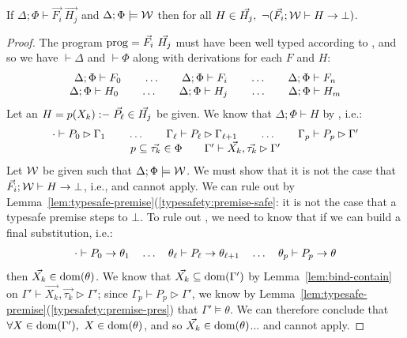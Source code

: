 \documentclass[acmsmall,screen,nonacm]{acmart}
\theoremstyle{definition}
\begin{document}
\begin{theorem}
\label{thm:typesafe-program-safe}
  If $\Delta; \Phi \vdash \vec{F_i} ~ \vec{H_j}$ and $\Delta; \Phi \models \mathcal{W}$ then
%
  for all $H \in \vec{H_j}, ~ \neg (\vec{F_i}; \mathcal{W} \vdash H \rightarrow \bot)$.
%
\begin{proof}
  The program $\mathrm{prog} = \vec{F_i} ~ \vec{H_j}$ must have been well
  typed according to , and so we have $\vdash \Delta$
  and $\vdash \Phi$ along with derivations for each $F$ and $H$:
%
  \[ \begin{array}{c} 
     \Delta; \Phi \vdash F_0 \quad\quad \dots \quad\quad
     \Delta; \Phi \vdash F_i \quad\quad \dots \quad\quad
     \Delta; \Phi \vdash F_n \\
     \Delta; \Phi \vdash H_0 \quad\quad \dots \quad\quad
     \Delta; \Phi \vdash H_j \quad\quad \dots \quad\quad
     \Delta; \Phi \vdash H_m \\
   \end{array} \]
%
  Let an $H = p(X_k) \mathrel{\mathsf{\mathord{:}\mathord{-}}} \vec{P_\ell} \in \vec{H_j}$ be given.
%
  We know that $\Delta; \Phi \vdash H$ by , i.e.:
%
  \[ \begin{array}{c}
     \cdot \vdash P_0 \rhd \Gamma_1 \quad\quad \dots \quad\quad
     \Gamma_{\ell} \vdash P_{\ell} \rhd \Gamma_{\ell+1} \quad\quad \dots \quad\quad
     \Gamma_p \vdash P_p \rhd \Gamma' \\
     p \subseteq \vec{\tau_k} \in \Phi \quad\quad
     \Gamma' \vdash \vec{X_k}, \vec{\tau_k} \rhd \Gamma'
  \end{array} \]
%
  Let $\mathcal{W}$ be given such that $\Delta; \Phi \models \mathcal{W}$.
%
  We must show that it is not the case that $\vec{F_i}; \mathcal{W} \vdash
  H \rightarrow \bot$, i.e.,  and  cannot
  apply.
%
  We can rule out  by
  Lemma~\ref{lem:typesafe-premise}(\ref{typesafety:premise-safe}: it
  is not the case that a typesafe premise steps to $\bot$.
%
  To rule out , we need to know that if we can build a
  final substitution, i.e.:
%
  \[ \begin{array}{c}
    \cdot    \vdash  P_{0} \rightarrow \theta_1 \quad \dots \quad
    \theta_\ell \vdash  P_{\ell} \rightarrow \theta_{\ell+1} \quad \dots \quad
    \theta_p \vdash  P_{p} \rightarrow \theta
  \end{array} \]
%
  then $\vec{X_k} \in \mathrm{dom}(\theta)$. We know that
  $\vec{X_k} \subseteq \mathrm{dom}(\Gamma')$ by Lemma~\ref{lem:bind-contain}
  on $\Gamma' \vdash \vec{X_k}, \vec{\tau_k} \rhd \Gamma'$; since
  $\Gamma_p \vdash P_{p} \rhd \Gamma'$, we know by
  Lemma~\ref{lem:typesafe-premise}(\ref{typesafety:premise-pres}) that
  $\Gamma' \models \theta$. We can therefore conclude that $\forall
  X \in \mathrm{dom}(\Gamma'), ~ X \in \mathrm{dom}(\theta)$, and so
  $\vec{X_k} \in \mathrm{dom}(\theta)$... and  cannot apply.
\end{proof}
\end{theorem}
\end{document}
